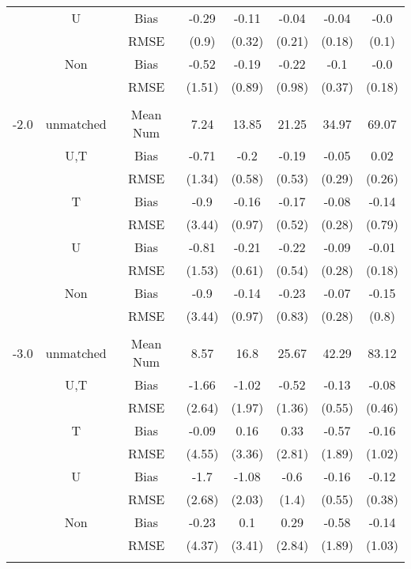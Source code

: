 \begin{tabular}{@{\extracolsep{5pt}}lc|cccccc}
 & U & Bias & -0.29 & -0.11 & -0.04 & -0.04 & -0.0 \\
 &  & RMSE & (0.9) & (0.32) & (0.21) & (0.18) & (0.1) \\
 & Non & Bias & -0.52 & -0.19 & -0.22 & -0.1 & -0.0 \\
 &  & RMSE & (1.51) & (0.89) & (0.98) & (0.37) & (0.18) \\
 &  &  &  &  &  &  &  \\
-2.0 & unmatched & Mean Num & 7.24 & 13.85 & 21.25 & 34.97 & 69.07 \\
 & U,T & Bias & -0.71 & -0.2 & -0.19 & -0.05 & 0.02 \\
 &  & RMSE & (1.34) & (0.58) & (0.53) & (0.29) & (0.26) \\
 & T & Bias & -0.9 & -0.16 & -0.17 & -0.08 & -0.14 \\
 &  & RMSE & (3.44) & (0.97) & (0.52) & (0.28) & (0.79) \\
 & U & Bias & -0.81 & -0.21 & -0.22 & -0.09 & -0.01 \\
 &  & RMSE & (1.53) & (0.61) & (0.54) & (0.28) & (0.18) \\
 & Non & Bias & -0.9 & -0.14 & -0.23 & -0.07 & -0.15 \\
 &  & RMSE & (3.44) & (0.97) & (0.83) & (0.28) & (0.8) \\
 &  &  &  &  &  &  &  \\
-3.0 & unmatched & Mean Num & 8.57 & 16.8 & 25.67 & 42.29 & 83.12 \\
 & U,T & Bias & -1.66 & -1.02 & -0.52 & -0.13 & -0.08 \\
 &  & RMSE & (2.64) & (1.97) & (1.36) & (0.55) & (0.46) \\
 & T & Bias & -0.09 & 0.16 & 0.33 & -0.57 & -0.16 \\
 &  & RMSE & (4.55) & (3.36) & (2.81) & (1.89) & (1.02) \\
 & U & Bias & -1.7 & -1.08 & -0.6 & -0.16 & -0.12 \\
 &  & RMSE & (2.68) & (2.03) & (1.4) & (0.55) & (0.38) \\
 & Non & Bias & -0.23 & 0.1 & 0.29 & -0.58 & -0.14 \\
 &  & RMSE & (4.37) & (3.41) & (2.84) & (1.89) & (1.03) \\
 &  &  &  &  &  &  &  \\
\hline 
\bottomrule 
\end{tabular}
